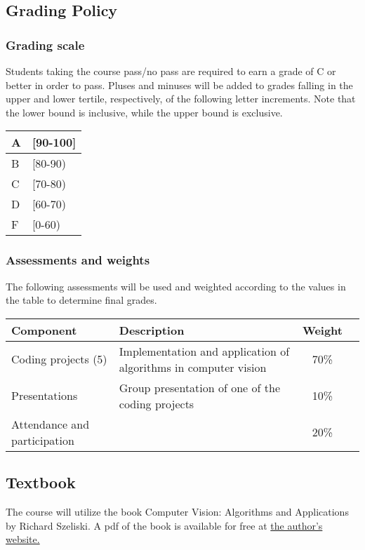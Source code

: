 \documentclass[12pt,letterpaper]{scrartcl}
\begin{document}
\subsection*{Grading Policy}

\subsubsection*{Grading scale}
Students taking the course pass/no pass are required to earn a grade of C or better in order to pass.  Pluses and minuses will be added to grades falling in the upper and lower tertile, respectively, of the following letter increments.  Note that the lower bound is inclusive, while the upper bound is exclusive.\\
\begin{tabular}{|l|l|}
\hline
A & [90-100]\\
\hline
B & [80-90) \\
\hline
C & [70-80) \\
\hline
D & [60-70) \\
\hline
F & [0-60) \\
\hline
\end{tabular}

\subsubsection*{Assessments and weights}
The following assessments will be used and weighted according to the values in the table to determine final grades.

\begin{center}
\begin{tabular}{|p{3cm}|p{10cm}|c|c|}
\hline
\textbf{Component} &\textbf{Description} &  \textbf{Weight}\\
\hline
\hline
Coding projects (5) & Implementation and application of algorithms in computer vision & 70\% \\ \hline
Presentations & Group presentation of one of the coding projects & 10\% \\ \hline
Attendance and participation &  & 20\% \\ \hline
\hline
\end{tabular}
\end{center}

\subsection*{Textbook}
The course will utilize the book Computer Vision: Algorithms and Applications by Richard Szeliski.  A pdf of the book is available for free at \href{http://szeliski.org/Book}{the author's website.}
\end{document}
